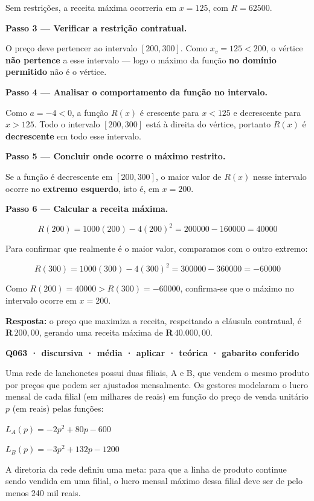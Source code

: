 \documentclass[11pt,a4paper]{article}
\begin{document}
Sem restrições, a receita máxima ocorreria em $x = 125$, com $R = 62500$.

\textbf{Passo 3 — Verificar a restrição contratual.}

O preço deve pertencer ao intervalo $[200, 300]$. Como $x_v = 125 < 200$, o vértice \textbf{não pertence} a esse intervalo — logo o máximo da função \textbf{no domínio permitido} não é o vértice.

\textbf{Passo 4 — Analisar o comportamento da função no intervalo.}

Como $a = -4 < 0$, a função $R(x)$ é crescente para $x < 125$ e decrescente para $x > 125$. Todo o intervalo $[200, 300]$ está à direita do vértice, portanto $R(x)$ é \textbf{decrescente} em todo esse intervalo.

\textbf{Passo 5 — Concluir onde ocorre o máximo restrito.}

Se a função é decrescente em $[200, 300]$, o maior valor de $R(x)$ nesse intervalo ocorre no \textbf{extremo esquerdo}, isto é, em $x = 200$.

\textbf{Passo 6 — Calcular a receita máxima.}

$$R(200) = 1000(200) - 4(200)^2 = 200000 - 160000 = 40000$$

Para confirmar que realmente é o maior valor, comparamos com o outro extremo:

$$R(300) = 1000(300) - 4(300)^2 = 300000 - 360000 = -60000$$

Como $R(200) = 40000 > R(300) = -60000$, confirma-se que o máximo no intervalo ocorre em $x = 200$.

\textbf{Resposta:} o preço que maximiza a receita, respeitando a cláusula contratual, é \textbf{R$\,200,00$}, gerando uma receita máxima de \textbf{R$\,40.000,00$}.

\bigskip\noindent\textbf{Q063 · discursiva · média · aplicar · teórica · gabarito conferido}\par\nopagebreak
Uma rede de lanchonetes possui duas filiais, A e B, que vendem o mesmo produto por preços que podem ser ajustados mensalmente. Os gestores modelaram o lucro mensal de cada filial (em milhares de reais) em função do preço de venda unitário $p$ (em reais) pelas funções:

$L_A(p) = -2p^2 + 80p - 600$

$L_B(p) = -3p^2 + 132p - 1200$

A diretoria da rede definiu uma meta: para que a linha de produto continue sendo vendida em uma filial, o lucro mensal máximo dessa filial deve ser de pelo menos 240 mil reais.
\end{document}

